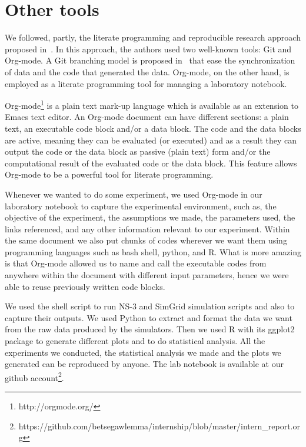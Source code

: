 \section{Other tools}
We followed, partly, the literate programming and reproducible research approach proposed in~\cite{DBLP:journals/sigops/StanisicLD15,schulte2012multi}. In this approach, the authors used two well-known tools: Git and Org-mode. A Git branching model is proposed in~\cite{DBLP:journals/sigops/StanisicLD15} that ease the synchronization of data and the code that generated the data. Org-mode, on the other hand, is employed as a literate programming tool for managing a laboratory notebook.  

Org-mode\footnote{http://orgmode.org/} is a plain text mark-up language which is available as an extension to Emacs text editor. An Org-mode document can have different sections: a plain text, an executable code block and/or a data block. The code and the data blocks are active, meaning they can be evaluated (or executed) and as a result they can output the code or the data block as passive (plain text) form and/or the computational result of the evaluated code or the data block. This feature allows Org-mode to be a powerful tool for literate programming.

Whenever we wanted to do some experiment, we used Org-mode in our laboratory notebook to capture the experimental environment, such as, the objective of the experiment, the assumptions we made, the parameters used, the links referenced, and any other information relevant to our experiment. Within the same document we also put chunks of codes wherever we want them using programming languages such as bash shell, python, and R. What is more amazing is that Org-mode allowed us to name and call the executable codes from anywhere within the document with different input parameters, hence we were able to reuse previously written code blocks. 

We used the shell script to run NS-3 and SimGrid simulation scripts and also to capture their outputs. We used Python to extract and format the data we want from the raw data produced by the simulators. Then we used R with its ggplot2 package to generate different plots and to do statistical analysis. All the experiments we conducted, the statistical analysis we made and the plots we generated can be reproduced by anyone. The lab notebook is available at our github account\footnote{https://github.com/betsegawlemma/internship/blob/master/intern{\_}report.org}.


